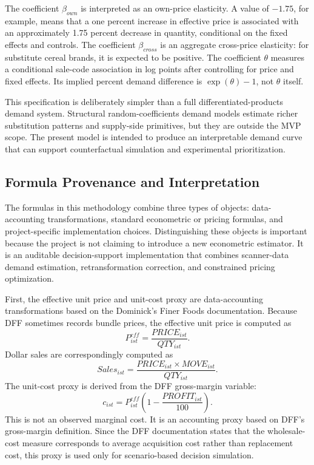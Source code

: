 \documentclass[11pt]{article}
\begin{document}
The coefficient $\beta_{own}$ is interpreted as an own-price elasticity. A value of $-1.75$, for example, means that a one percent increase in effective price is associated with an approximately 1.75 percent decrease in quantity, conditional on the fixed effects and controls. The coefficient $\beta_{cross}$ is an aggregate cross-price elasticity: for substitute cereal brands, it is expected to be positive. The coefficient $\theta$ measures a conditional sale-code association in log points after controlling for price and fixed effects. Its implied percent demand difference is $\exp(\theta)-1$, not $\theta$ itself.

This specification is deliberately simpler than a full differentiated-products demand system. Structural random-coefficients demand models estimate richer substitution patterns and supply-side primitives, but they are outside the MVP scope. The present model is intended to produce an interpretable demand curve that can support counterfactual simulation and experimental prioritization.

\subsection{Formula Provenance and Interpretation}

The formulas in this methodology combine three types of objects: data-accounting transformations, standard econometric or pricing formulas, and project-specific implementation choices. Distinguishing these objects is important because the project is not claiming to introduce a new econometric estimator. It is an auditable decision-support implementation that combines scanner-data demand estimation, retransformation correction, and constrained pricing optimization.

First, the effective unit price and unit-cost proxy are data-accounting transformations based on the Dominick's Finer Foods documentation. Because DFF sometimes records bundle prices, the effective unit price is computed as
\begin{equation}
P^{eff}_{ist}=\frac{PRICE_{ist}}{QTY_{ist}}.
\end{equation}
Dollar sales are correspondingly computed as
\begin{equation}
Sales_{ist}=\frac{PRICE_{ist}\times MOVE_{ist}}{QTY_{ist}}.
\end{equation}
The unit-cost proxy is derived from the DFF gross-margin variable:
\begin{equation}
c_{ist}=P^{eff}_{ist}\left(1-\frac{PROFIT_{ist}}{100}\right).
\end{equation}
This is not an observed marginal cost. It is an accounting proxy based on DFF's gross-margin definition. Since the DFF documentation states that the wholesale-cost measure corresponds to average acquisition cost rather than replacement cost, this proxy is used only for scenario-based decision simulation.
\end{document}
